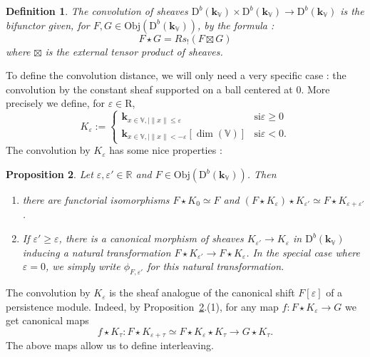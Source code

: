 \documentclass[a4paper, english, 11pt]{article}
\newcommand{\kk}[0]{\textbf{k}}
\newcommand{\0}{\vec{0}}
\newcommand{\R}[0]{\mathbb{R}}
\newcommand{\V}[0]{\mathbb{V}}
\newcommand{\D}[0]{\text{D}}
\newcommand{\Obj}[0]{\text{Obj}}
\newcommand{\Rr}[0]{\text{R}}
\newtheorem{prop}{Proposition}[section]
\newtheorem{defi}[prop]{Definition}
\begin{document}
\begin{defi}\label{D:Convolution} The convolution of sheaves  $\D^b(\kk_\V)\times \D^b(\kk_\V) \to \D^b(\kk_\V)$ is the bifunctor given, 
for $F,G\in \Obj(\D^b(\kk_\V))$,  by the formula : $$F\star G = R s_!(F\boxtimes G)$$ where $\boxtimes$ is the external tensor product of sheaves. 
\end{defi}
To define the convolution distance,  we will only need a very specific case : the convolution by the constant sheaf supported on a ball centered at 0. 
More precisely we define, for $\varepsilon \in \Rr$, 
\begin{equation}\label{eq:defKepsilon}
 K_\varepsilon :=  \left\{ \begin{array}{cc} 
 \kk_{x\in \V, \mid \|x\|\leq \varepsilon}  & \mbox{si} \varepsilon \geq 0 \\
 \kk_{x\in \V, \mid \|x\|< -\varepsilon}[\dim(\V)]  & \mbox{si} \varepsilon < 0 .\end{array} \right.
\end{equation}
The convolution by $K_\varepsilon$ has some nice properties : 
\begin{prop}\label{P:propertiesofconvolution} Let $\varepsilon, \varepsilon'\in \R$ and $F \in \Obj(\D^b(\kk_\V))$. Then
\begin{enumerate}
\item there are functorial isomorphisms $F\star K_0\simeq F$ and $(F\star K_{\varepsilon} )\star K_{\varepsilon'} \simeq F \star K_{\varepsilon + \varepsilon'} $.
\item If $\varepsilon' \geq \varepsilon $, there is a canonical morphism of sheaves 
$K_{\varepsilon'}\to K_{\varepsilon}$ in $\D^b(\kk_\V)$
inducing a natural transformation $F\star K_{\varepsilon'} \to F \star K_{\varepsilon} $. 
In the special case where $\varepsilon = 0$, we simply write $\phi_{F, \varepsilon'}$ for this natural transformation.
\end{enumerate}
\end{prop}
The convolution by $K_{\varepsilon}$ is the sheaf analogue of the canonical shift $F[\varepsilon]$ of a persistence module. Indeed, by
Proposition~\ref{P:propertiesofconvolution}.(1),  for any map $f: F\star K_{\varepsilon} \to G$ we get  canonical maps  
\begin{equation} \label{eq:propertiesofconvolution} f\star K_{\tau}: F\star K_{\varepsilon+\tau}\simeq F\star  K_{\varepsilon}\star K_{\tau}  \to G \star K_{\tau}.\end{equation} 
The above maps allow us to define interleaving.
\end{document}

